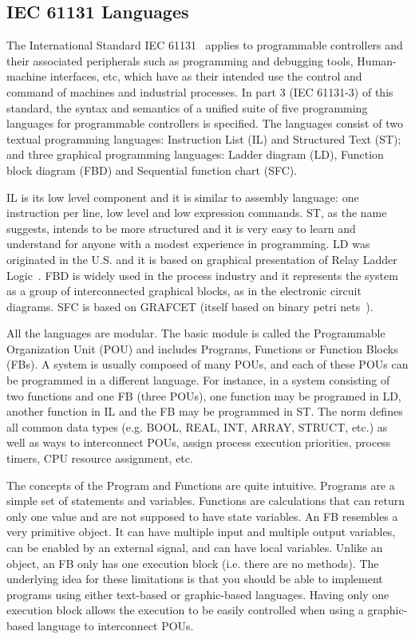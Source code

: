\documentclass[11pt,twoside]{article}
\begin{document}
\begin{multicols}{2}
\subsection{IEC 61131 Languages}
\label{sec:Languages}

The International Standard IEC 61131~\cite{IEC} applies to programmable controllers and their associated peripherals such as programming and debugging tools, Human-machine interfaces, etc, which have as their intended use the control and command of machines and industrial processes. In part 3 (IEC 61131-3) of this standard, the syntax and semantics of a unified suite of five programming languages for programmable controllers is specified. The languages consist of two textual programming languages: Instruction List (IL) and Structured Text (ST); and three graphical programming languages: Ladder diagram (LD), Function block diagram (FBD) and Sequential function chart (SFC).  

IL is its low level component and it is similar to assembly language: one instruction per line, low level and low expression commands. ST, as the name suggests, intends to be more structured and it is very easy to learn and understand for anyone with a modest experience in programming.  LD was originated in the U.S. and it is based on graphical presentation of Relay Ladder Logic~\cite{Kamen1999}. FBD is widely used in the process industry and it represents the system as a group of interconnected graphical blocks, as in the electronic circuit diagrams. SFC is based on GRAFCET (itself based on binary petri nets~\cite{Reisig1991}).

All the languages are modular. The basic module is called the Programmable Organization Unit (POU) and includes Programs, Functions or Function Blocks (FBs). A system is usually composed of many POUs, and each of these POUs can be programmed in a different language. For instance, in a system consisting of two functions and one FB (three POUs), one function may be programed in LD, another function in IL and the FB may be programmed in ST. The norm defines all common data types (e.g. BOOL, REAL, INT, ARRAY, STRUCT, etc.) as well as ways to interconnect POUs, assign process execution priorities, process timers, CPU resource assignment, etc.

The concepts of the Program and Functions are quite intuitive. Programs are a simple set of statements and variables. Functions are calculations that can return only one value and are not supposed to have state variables. An FB resembles a very primitive object.  It can have multiple input and multiple output variables, can be enabled by an external signal, and can have local variables. Unlike an object, an FB only has one execution block (i.e. there are no methods). The underlying idea for these limitations is that you should be able to implement programs using either text-based or graphic-based languages. Having only one execution block allows the execution to be easily controlled when using a graphic-based language to interconnect POUs.


\end{multicols}
\end{document}
